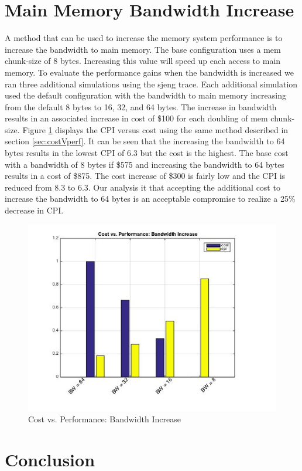 \documentclass[11pt,titlepage]{article}
\begin{document}
\section{Main Memory Bandwidth Increase}
   A method that can be used to increase the memory system performance is to increase the bandwidth to main memory. The base configuration uses a mem chunk-size of 8 bytes. Increasing this value will speed up each access to main memory. To evaluate the performance gains when the bandwidth is increased we ran three additional simulations using the sjeng trace. Each additional simulation used the default configuration with the bandwidth to main memory increasing from the default 8 bytes to 16, 32, and 64 bytes. The increase in bandwidth results in an associated increase in cost of \$100 for each doubling of mem chunk-size. Figure \ref{fig:exSj} displays the CPI versus cost using the same method described in section \ref{sec:costVperf}. It can be seen that the increasing the bandwidth to 64 bytes results in the lowest CPI of 6.3 but the cost is the highest. The base cost with a bandwidth of 8 bytes if \$575 and increasing the bandwidth to 64 bytes results in a cost of \$875. The cost increase of \$300 is fairly low and the CPI is reduced from 8.3 to 6.3. Our analysis it that accepting the additional cost to increase the bandwidth to 64 bytes is an acceptable compromise to realize a 25\% decrease in CPI.
   \begin{figure}[H]
       \centering
       \includegraphics[scale=0.75]{extraSjeng}
       \caption{Cost vs. Performance: Bandwidth Increase}
       \label{fig:exSj}
   \end{figure}

\section{Conclusion}
\end{document}
